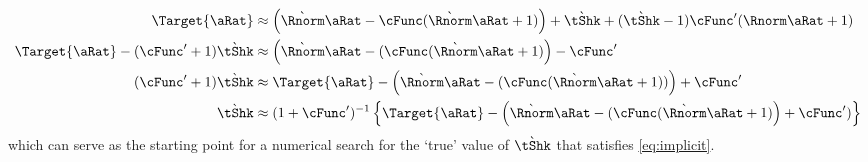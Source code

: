 \documentclass[\econtexRoot/BufferStockTheory.tex]{subfiles}
\begin{document}
\begin{align}
  \Target{\pnt} & \approx \left(
                  \Nxt{\Rnorm} \pnt  - \cFunc(\Nxt{\Rnorm}\pnt+1)
                  \right)
                  +\Nxt{\tShk}+(\Nxt{\tShk}-1)\cFunc^{\prime}(\Rnorm \pnt + 1)
  \\ \Target{\pnt} -(\cFunc^{\prime}+1)\Nxt{\tShk} & \approx  \left(\Nxt{\Rnorm} \pnt  - (\cFunc(\Nxt{\Rnorm}\pnt+1)\right)-\cFunc^{\prime}
  \\  (\cFunc^{\prime}+1)\Nxt{\tShk} & \approx \Target{\pnt}- \left(\Nxt{\Rnorm} \pnt  - (\cFunc(\Nxt{\Rnorm}\pnt+1))\right)+\cFunc^{\prime}                                             \\  \Nxt{\tShk} & \approx  (1+\cFunc^{\prime})^{-1}\left\{\Target{\pnt}- \left(\Nxt{\Rnorm} \pnt  - (\cFunc(\Nxt{\Rnorm}\pnt+1)\right)+\cFunc^{\prime})\right\}
\end{align}
which can serve as the starting point for a numerical search for the `true' value of $\Nxt{\tShk}$ that satisfies \eqref{eq:implicit}.
\end{document}
